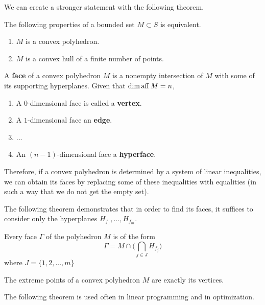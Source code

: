   We can create a stronger statement with the following theorem. 

  \begin{theorem}
    The following properties of a bounded set $M \subset S$ is equivalent.
    \begin{enumerate}
      \item $M$ is a convex polyhedron. 
      \item $M$ is a convex hull of a finite number of points. 
    \end{enumerate}
  \end{theorem}

  \begin{definition}
    A \textbf{face} of a convex polyhedron $M$ is a nonempty intersection of $M$ with some of its supporting hyperplanes. Given that $\dim \operatorname{aff} M = n$, 
    \begin{enumerate}
      \item A $0$-dimensional face is called a \textbf{vertex}. 
      \item A $1$-dimensional face an \textbf{edge}. 
      \item ...
      \item An $(n-1)$-dimensional face a \textbf{hyperface}. 
    \end{enumerate}
  \end{definition}

  Therefore, if a convex polyhedron is determined by a system of linear inequalities, we can obtain its faces by replacing some of these inequalities with equalities (in such a way that we do not get the empty set). 

  The following theorem demonstrates that in order to find its faces, it suffices to consider only the hyperplanes $H_{f_1}, ..., H_{f_m}$. 

  \begin{theorem}
    Every face $\Gamma$ of the polyhedron $M$ is of the form
    \begin{equation}
      \Gamma = M \cap \bigg( \bigcap_{j \in J} H_{f_j} \bigg)
    \end{equation}
    where $J = \{1, 2, ..., m\}$
  \end{theorem}

  \begin{theorem}
    The extreme points of a convex polyhedron $M$ are exactly its vertices. 
  \end{theorem}

  The following theorem is used often in linear programming and in optimization. 

